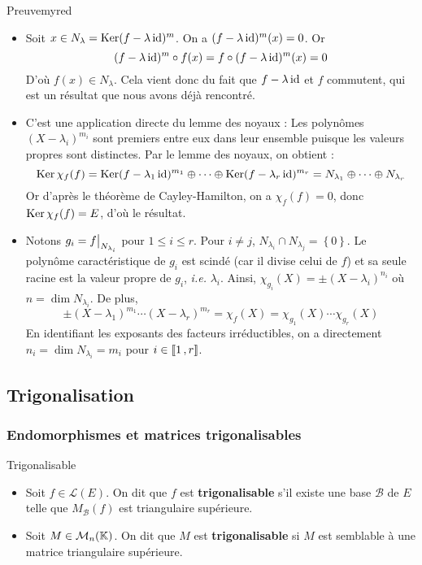     \begin{demo}{Preuve}{myred}
        \begin{itemize}
            \item Soit $x \in N_{\lambda} = \operatorname{Ker}(f - \lambda \operatorname{id})^m$. On a $(f - \lambda \operatorname{id})^m(x) = 0$. Or 
            \[ (f - \lambda \operatorname{id})^m \circ f(x) = f \circ (f - \lambda \operatorname{id})^m (x) = 0 \]   
            D’où $f(x) \in N_{\lambda}$. Cela vient donc du fait que $f - \lambda \operatorname{id}$ et $f$ commutent, qui est un résultat que nous avons déjà rencontré.
            \item C’est une application directe du lemme des noyaux : Les polynômes $(X - \lambda_i)^{m_i}$ sont premiers entre eux dans leur ensemble puisque les valeurs propres sont distinctes. Par le lemme des noyaux, on obtient : 
            \[ \operatorname{Ker} \chi_f(f) = \operatorname{Ker}(f - \lambda_1 \operatorname{id})^{m_1} \oplus \cdots \oplus \operatorname{Ker}(f - \lambda_r \operatorname{id})^{m_r} = N_{\lambda_1} \oplus \cdots \oplus N_{\lambda_r} \]    
            Or d’après le théorème de Cayley-Hamilton, on a $\chi_f(f) = 0$, donc $\operatorname{Ker} \chi_f(f) = E$, d’où le résultat.
            \item Notons $g_i = \restr{f}{N_{\lambda_i}}$ pour $1 \leq i \leq r$. Pour $i \neq j$, $N_{\lambda_i} \cap N_{\lambda_j} = \left\{0\right\}$. Le polynôme caractéristique de $g_i$ est scindé (car il divise celui de $f$) et sa seule racine est la valeur propre de $g_i$, \textit{i.e.} $\lambda_i$. Ainsi, $\chi_{g_i} (X) = \pm (X - \lambda_i)^{n_i}$ où $n = \dim N_{\lambda_i}$. De plus, 
            \[ \pm (X - \lambda_1)^{m_1} \cdots (X - \lambda_r)^{m_r} = \chi_f(X) = \chi_{g_1}(X) \cdots \chi_{g_r}(X) \]    
            En identifiant les exposants des facteurs irréductibles, on a directement $n_i = \dim N_{\lambda_i} = m_i$ pour $i \in \left\llbracket 1 \, , r \right\rrbracket$.
        \end{itemize}
    \end{demo}

\subsection{Trigonalisation}    

    \subsubsection{Endomorphismes et matrices trigonalisables}

    \begin{defi}{Trigonalisable}{}
        \begin{itemize}
            \item Soit $f \in \mathcal{L}(E)$. On dit que $f$ est \textbf{trigonalisable} s’il existe une base $\mathcal{B}$ de $E$ telle que $M_{\mathcal{B}}(f)$ est triangulaire supérieure.
            \item Soit $M \in \mathcal{M}_{n}(\mathbb{K})$. On dit que $M$ est \textbf{trigonalisable} si $M$ est semblable à une matrice triangulaire supérieure.
        \end{itemize}
    \end{defi}

